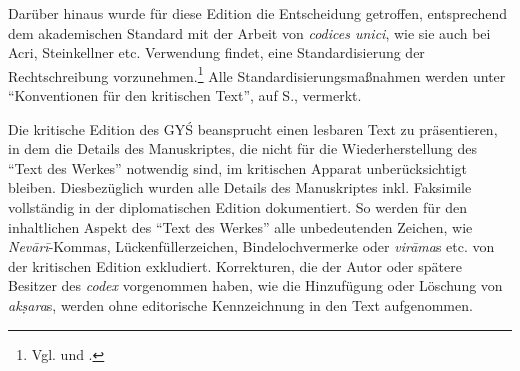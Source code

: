 \documentclass[a4paper,12pt]{article}
\begin{document}
{Darüber hinaus wurde für diese Edition die Entscheidung getroffen, entsprechend dem akademischen Standard mit der Arbeit von \textit{codices unici}, wie sie auch bei Acri, Steinkellner etc. Verwendung findet, eine Standardisierung der Rechtschreibung vorzunehmen.\footnote{Vgl. \parencite[lvi-lviii]{steinkellner2005} und \parencite[xxxiii]{kramer2013a}.} Alle Standardisierungsmaßnahmen werden unter ``Konventionen für den kritischen Text'', auf S.\pageref{konvkrit}, vermerkt.

Die kritische Edition des GYŚ beansprucht einen lesbaren Text zu präsentieren, in dem die Details des Manuskriptes, die nicht für die Wiederherstellung des ``Text des Werkes'' notwendig sind, im kritischen Apparat unberücksichtigt bleiben. Diesbezüglich wurden alle Details des Manuskriptes inkl. Faksimile vollständig in der diplomatischen Edition dokumentiert. So werden für den inhaltlichen Aspekt des ``Text des Werkes'' alle unbedeutenden Zeichen, wie \textit{Nevārī}-Kommas, Lückenfüllerzeichen, Bindelochvermerke oder \textit{virāma}s etc. von der kritischen Edition exkludiert. Korrekturen, die der Autor oder spätere Besitzer des \textit{codex} vorgenommen haben, wie die Hinzufügung oder Löschung von \textit{akṣara}s, werden ohne editorische Kennzeichnung in den Text aufgenommen. 

}
\end{document}
